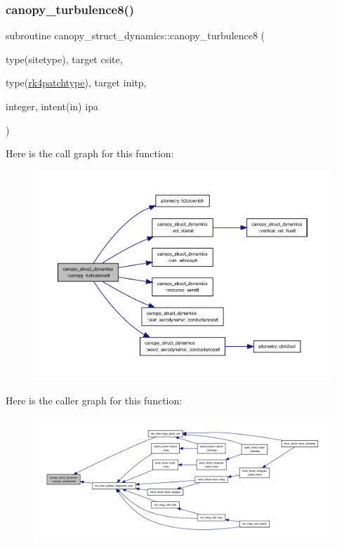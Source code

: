 \subsubsection{\texorpdfstring{canopy\+\_\+turbulence8()}{canopy\_turbulence8()}}
{\footnotesize\ttfamily subroutine canopy\+\_\+struct\+\_\+dynamics\+::canopy\+\_\+turbulence8 (\begin{DoxyParamCaption}\item[{type(sitetype), target}]{csite,  }\item[{type(\hyperlink{structrk4__coms_1_1rk4patchtype}{rk4patchtype}), target}]{initp,  }\item[{integer, intent(in)}]{ipa }\end{DoxyParamCaption})}

Here is the call graph for this function\+:
\nopagebreak
\begin{figure}[H]
\begin{center}
\leavevmode
\includegraphics[width=350pt]{namespacecanopy__struct__dynamics_ab65e289b4069536fa3342bc3034db824_cgraph}
\end{center}
\end{figure}
Here is the caller graph for this function\+:
\nopagebreak
\begin{figure}[H]
\begin{center}
\leavevmode
\includegraphics[width=350pt]{namespacecanopy__struct__dynamics_ab65e289b4069536fa3342bc3034db824_icgraph}
\end{center}
\end{figure}
\mbox{\label{namespacecanopy__struct__dynamics_a2418e416a98f5c0dec59aeb173f92f75}} 
